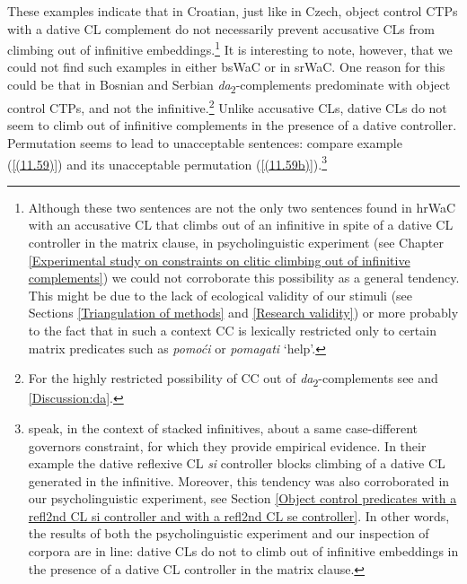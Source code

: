 \noindent These examples indicate that in Croatian, just like in Czech, object control CTPs with a dative CL complement do not necessarily prevent accusative CLs from climbing out of infinitive embeddings.\footnote{Although these two sentences are not the only two sentences found in hrWaC with an accusative CL that climbs out of an infinitive in spite of a dative CL controller in the matrix clause, in psycholinguistic experiment (see Chapter \ref{Experimental study on constraints on clitic climbing out of infinitive complements}) we could not corroborate this possibility as a general tendency. This might be due to the lack of ecological validity of our stimuli (see Sections \ref{Triangulation of methods} and \ref{Research validity}) or more probably to the fact that in such a context CC is lexically restricted only to certain matrix predicates such as \textit{pomoći} or \textit{pomagati} ‘help’. } It is interesting to note, however, that we could not find such examples in either bsWaC or in srWaC. One reason for this could be that in Bosnian and Serbian \textit{da}\textsubscript{2}-complements predominate with object control CTPs, and not the infinitive.\footnote{For the highly restricted possibility of CC out of \textit{da}\textsubscript{2}-complements see \citet*{JHK17a} and \ref{Discussion:da}.}
Unlike accusative CLs, dative CLs do not seem to climb out of infinitive complements in the presence of a dative controller. Permutation seems to lead to unacceptable sentences: compare example (\ref{(11.59)}) and its unacceptable permutation (\ref{(11.59b)}).\footnote{\citet*[263, 265]{HKJ18} speak, in the context of stacked infinitives, about a same case-different governors constraint, for which they provide empirical evidence. In their example the dative reflexive CL \textit{si} controller blocks climbing of a dative CL generated in the infinitive. Moreover, this tendency was also corroborated in our psycholinguistic experiment, see Section \ref{Object control predicates with a refl2nd CL si controller and with a refl2nd CL se controller}. In other words, the results of both the psycholinguistic experiment and our inspection of corpora are in line: dative CLs do not to climb out of infinitive embeddings in the presence of a dative CL controller in the matrix clause.}

